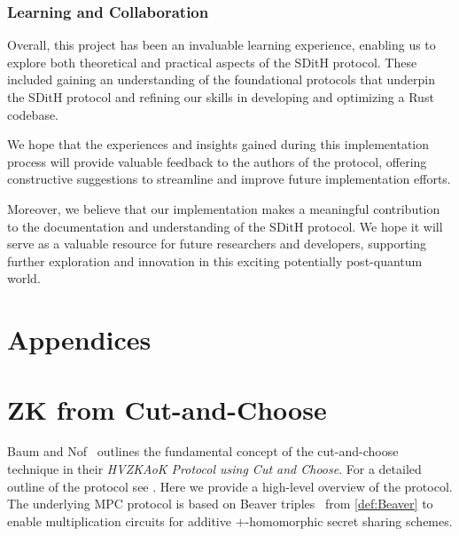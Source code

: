 \documentclass[11pt]{report}
\theoremstyle{definition}
\theoremstyle{plain}
\begin{document}

\subsubsection{Learning and Collaboration}
Overall, this project has been an invaluable learning experience, enabling us to explore both theoretical and practical aspects of the SDitH protocol. These included gaining an understanding of the foundational protocols that underpin the SDitH protocol and refining our skills in developing and optimizing a Rust codebase.

We hope that the experiences and insights gained during this implementation process will provide valuable feedback to the authors of the protocol, offering constructive suggestions to streamline and improve future implementation efforts.

Moreover, we believe that our implementation makes a meaningful contribution to the documentation and understanding of the SDitH protocol. We hope it will serve as a valuable resource for future researchers and developers, supporting further exploration and innovation in this exciting potentially post-quantum world.


\cleardoublepage
{}




\cleardoublepage

\appendix
\section*{Appendices}
\renewcommand{\thesection}{\Alph{section}}

\section{ZK from Cut-and-Choose}\label{sec:zk-cut-and-choose}

Baum and Nof~\cite{baum2020concretely} outlines the fundamental concept of the cut-and-choose technique in their \textit{HVZKAoK Protocol using Cut and Choose}. For a detailed outline of the protocol see \cite[s3.2]{baum2020concretely}. Here we provide a high-level overview of the protocol. The underlying MPC protocol is based on Beaver triples~\cite{Beaver1992efficient} from \autoref{def:Beaver} to enable multiplication circuits for additive $+$-homomorphic secret sharing schemes.
\end{document}
